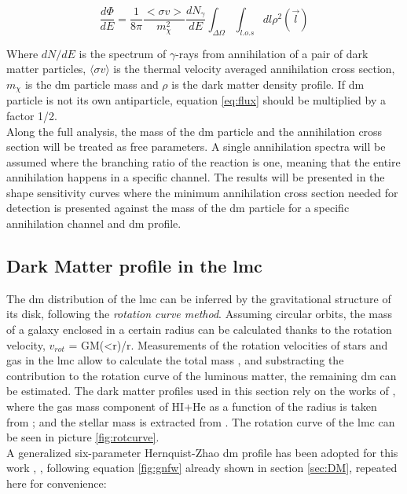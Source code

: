 \documentclass[main.tex]{subfiles}
\begin{document}
\begin{equation}
    \frac{d \Phi}{dE}=\frac{1}{8 \pi} \frac{<\sigma v>}{m_{\chi}^2} \frac{d N_{\gamma}}{dE} \int_{\Delta\Omega}\int_{l.o.s} dl \rho^2(\vec{l})
\label{eq:flux}
\end{equation}

Where $dN/dE$ is the spectrum of $\gamma$-rays from annihilation of a pair of dark matter particles, $\langle\sigma v\rangle$ is the thermal velocity averaged annihilation cross section, $m_\chi$ is the \gls{dm} particle mass and $\rho$ is the dark matter density profile. If \gls{dm} particle is not its own antiparticle, equation \ref{eq:flux} should be multiplied by a factor 1/2. \\
Along the full analysis, the mass of the \gls{dm} particle and the annihilation cross section will be treated as free parameters. A single annihilation spectra will be assumed where the branching ratio of the reaction is one, meaning that the entire annihilation happens in a specific channel. The results will be presented in the shape sensitivity curves where the minimum annihilation cross section needed for detection is presented against the mass of the \gls{dm} particle for a specific annihilation channel and \gls{dm} profile.

\subsection{Dark Matter profile in the \gls{lmc}}

The \gls{dm} distribution of the \gls{lmc} can be inferred by the gravitational structure of its disk, following the \textit{rotation curve method}. Assuming circular orbits, the mass of a galaxy enclosed in a certain radius can be calculated thanks to the rotation velocity, $v_{rot}$ = GM(<r)/r. Measurements of the rotation velocities of stars and gas in the \gls{lmc} allow to calculate the total mass \cite{LMCHI}, and substracting the contribution to the rotation curve of the luminous matter, the remaining \gls{dm} can be estimated. The dark matter profiles used in this section rely on the works of \cite{2015FermiLMCDM}, where the gas mass component of HI+He as a function of the radius is taken from \cite{1992gasLMC}; and the stellar mass is extracted from \cite{2006LMCkinematics}. The rotation curve of the \gls{lmc} can be seen in picture \ref{fig:rotcurve}.\\
A generalized six-parameter Hernquist-Zhao \gls{dm} profile has been adopted for this work \cite{1990Hernquist}, \cite{1996Zhao}, following equation \ref{fig:gnfw} already shown in section \ref{sec:DM}, repeated here for convenience:
\end{document}
